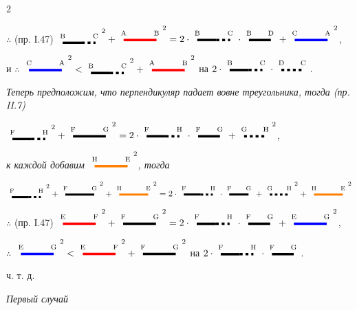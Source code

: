 \documentclass[a4paper,12pt]{article}
\newcommand{\seg}[3][black]{%
\begin{tikzpicture}[baseline=-0.5ex]
  \draw[#1, line width=2.5pt] (0,0) -- (1.2,0);
  \node[above, font=\scriptsize] at (0,0.05) {#2};
  \node[above, font=\scriptsize] at (1.2,0.05) {#3};
\end{tikzpicture}%
}
\newcommand{\segsm}[3][black]{%
\begin{tikzpicture}[baseline=-0.5ex]
  \draw[#1, line width=2.5pt] (0,0) -- (0.8,0);
  \node[above, font=\scriptsize] at (0,0.05) {#2};
  \node[above, font=\scriptsize] at (0.8,0.05) {#3};
\end{tikzpicture}%
}
\newcommand{\mixsegpow}[6][black]{%
\begin{tikzpicture}[baseline=0.2ex]
  \draw[#1, line width=2.5pt] (0,0) -- (#2,0);
  \draw[#1, line width=2.5pt, dash pattern=on 3pt off 3pt] (#2,0) -- ({#2+#3},0);
  \node[above, font=\scriptsize] at (0,0.05) {#4};
  \node[above, font=\scriptsize] at ({#2+#3},0.05) {#5};
\end{tikzpicture}^{#6}%
}
\newcommand{\mixseg}[5][black]{%
\begin{tikzpicture}[baseline=-0.5ex]
  \draw[#1, line width=2.5pt] (0,0) -- (#2,0);
  \draw[#1, line width=2.5pt, dash pattern=on 3pt off 3pt] (#2,0) -- ({#2+#3},0);
  \node[above, font=\scriptsize] at (0,0.05) {#4};
  \node[above, font=\scriptsize] at ({#2+#3},0.05) {#5};
\end{tikzpicture}%
}
\newcommand{\dsegsm}[3][black]{%
\begin{tikzpicture}[baseline=-0.5ex]
  \draw[#1, line width=2.5pt, dash pattern=on 3pt off 3pt] (0,0) -- (0.8,0);
  \node[above, font=\scriptsize] at (0,0.05) {#2};
  \node[above, font=\scriptsize] at (0.8,0.05) {#3};
\end{tikzpicture}%
}
\begin{document}
\begin{paracol}{2}
\vspace{0.2cm}

$\therefore$ (пр. I.47) $\mixsegpow[black]{0.7}{0.5}{B}{C}{2} + \seg[red]{A}{B}^2 = 2 \cdot \mixseg[black]{0.7}{0.5}{B}{C} \cdot \segsm[black]{B}{D} + \seg[blue]{C}{A}^2$,

\vspace{0.2cm}

и $\therefore$ $\seg[blue]{C}{A}^2 < \mixsegpow[black]{0.7}{0.5}{B}{C}{2} + \seg[red]{A}{B}^2$ на $2 \cdot \mixseg[black]{0.7}{0.5}{B}{C} \cdot \dsegsm[black]{D}{C}$.

\vspace{0.5cm}

\textit{Теперь предположим, что перпендикуляр падает вовне треугольника, тогда (пр. II.7)}

\vspace{0.2cm}

$\mixsegpow[black]{0.7}{0.5}{F}{H}{2} + \seg[black]{F}{G}^2 = 2 \cdot \mixseg[black]{0.7}{0.5}{F}{H} \cdot \segsm[black]{F}{G} + \dsegsm[black]{G}{H}^2$,

\vspace{0.2cm}

\textit{к каждой добавим $\seg[orange]{H}{E}^2$, тогда}

\vspace{0.2cm}

$\mixsegpow[black]{0.7}{0.5}{F}{H}{2} + \seg[black]{F}{G}^2 + \seg[orange]{H}{E}^2 = 2 \cdot \mixseg[black]{0.7}{0.5}{F}{H} \cdot \segsm[black]{F}{G} + \dsegsm[black]{G}{H}^2 + \seg[orange]{H}{E}^2$

\vspace{0.2cm}

$\therefore$ (пр. I.47) $\seg[red]{E}{F}^2 + \seg[black]{F}{G}^2 = 2 \cdot \mixseg[black]{0.7}{0.5}{F}{H} \cdot \segsm[black]{F}{G} + \seg[blue]{E}{G}^2$,

\vspace{0.2cm}

$\therefore$ $\seg[blue]{E}{G}^2 < \seg[red]{E}{F}^2 + \seg[black]{F}{G}^2$ на $2 \cdot \mixseg[black]{0.7}{0.5}{F}{H} \cdot \segsm[black]{F}{G}$.

\vspace{0.5cm}

\hfill ч. т. д.

\switchcolumn

\vspace{0.5cm}

\centering
\textit{Первый случай}


\end{paracol}
\end{document}
